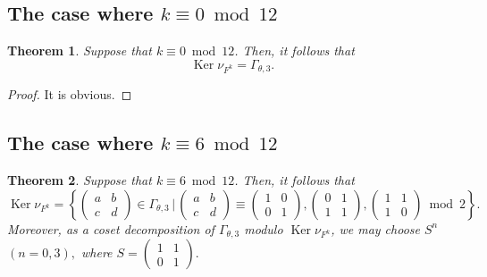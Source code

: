 \documentclass[12pt]{article}
\theoremstyle{definition}
\newtheorem{theorem}{Theorem}
\numberwithin{equation}{section}
\numberwithin{theorem}{section}
\newcommand{\Ker}{\operatorname{Ker}}
\begin{document}
\subsection{The case where $k\equiv 0 \bmod{12}$}


\begin{theorem}
{\it
Suppose that 
$k\equiv 0 \bmod{12}$. 
Then, it follows that 
\begin{equation*}
\Ker \nu_{F^{k}}
=\Gamma_{\theta,3}.
\end{equation*}
}
\end{theorem}


\begin{proof}
It is obvious. 
\end{proof}








\subsection{The case where $k\equiv 6 \bmod{12}$}




\begin{theorem}
\label{thmk=6-level3}
{\it
Suppose that 
$k\equiv 6 \bmod{12}$. 
Then, it follows that 
\begin{equation*}
\Ker \nu_{F^{k}}
=
\left\{
\begin{pmatrix}
a & b \\
c & d
\end{pmatrix}
\in
\Gamma_{\theta,3} \,\Big| \, 
\begin{pmatrix}
a & b \\
c & d
\end{pmatrix}
\equiv
\begin{pmatrix}
1 & 0 \\
0 & 1
\end{pmatrix}, 
\begin{pmatrix}
0 & 1 \\
1 & 1
\end{pmatrix},
\begin{pmatrix}
1 & 1 \\
1 & 0
\end{pmatrix}
\bmod{2}
\right\}.
\end{equation*}
Moreover, 
as a coset decomposition of $\Gamma_{\theta,3}$ modulo $\Ker \nu_{F^{k}}$,  
we may choose $S^{n}$ $(n=0,3),$ where 
$
S=
\begin{pmatrix}
1 & 1 \\
0 & 1
\end{pmatrix}. 
$
}
\end{theorem}
\end{document}
